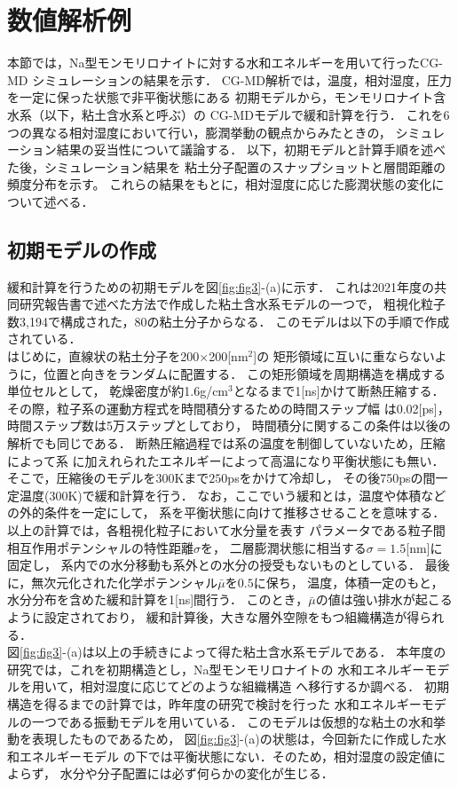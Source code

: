 \section{数値解析例}
本節では，Na型モンモリロナイトに対する水和エネルギーを用いて行ったCG-MD
シミュレーションの結果を示す．
CG-MD解析では，温度，相対湿度，圧力を一定に保った状態で非平衡状態にある
初期モデルから，モンモリロナイト含水系（以下，粘土含水系と呼ぶ）の
CG-MDモデルで緩和計算を行う．
これを6つの異なる相対湿度において行い，膨潤挙動の観点からみたときの，
シミュレーション結果の妥当性について議論する．
以下，初期モデルと計算手順を述べた後，シミュレーション結果を
粘土分子配置のスナップショットと層間距離の頻度分布を示す。
これらの結果をもとに，相対湿度に応じた膨潤状態の変化について述べる．
\subsection{初期モデルの作成}
緩和計算を行うための初期モデルを図\ref{fig:fig3}-(a)に示す．
これは2021年度の共同研究報告書で述べた方法で作成した粘土含水系モデルの一つで，
粗視化粒子数3,194で構成された，80の粘土分子からなる．
このモデルは以下の手順で作成されている．\\
はじめに，直線状の粘土分子を200$\times$200[nm$^2$]の
矩形領域に互いに重ならないように，位置と向きをランダムに配置する．
この矩形領域を周期構造を構成する単位セルとして，
乾燥密度が約1.6g/cm$^{3}$となるまで1[ns]かけて断熱圧縮する．
その際，粒子系の運動方程式を時間積分するための時間ステップ幅
は0.02[ps]，時間ステップ数は5万ステップとしており，
時間積分に関するこの条件は以後の解析でも同じである．
断熱圧縮過程では系の温度を制御していないため，圧縮によって系
に加えれられたエネルギーによって高温になり平衡状態にも無い．
そこで，圧縮後のモデルを300Kまで$250$psをかけて冷却し，
その後750psの間一定温度(300K)で緩和計算を行う．
なお，ここでいう緩和とは，温度や体積などの外的条件を一定にして，
系を平衡状態に向けて推移させることを意味する．
以上の計算では，各粗視化粒子において水分量を表す
パラメータである粒子間相互作用ポテンシャルの特性距離$\sigma$を，
二層膨潤状態に相当する$\sigma=1.5$[nm]に固定し，
系内での水分移動も系外との水分の授受もないものとしている．
最後に，無次元化された化学ポテンシャル$\bar \mu$を$0.5$に保ち，
温度，体積一定のもと，水分分布を含めた緩和計算を1[ns]間行う．
このとき，$\bar \mu$の値は強い排水が起こるように設定されており，
緩和計算後，大きな層外空隙をもつ組織構造が得られる．\\
図\ref{fig:fig3}-(a)は以上の手続きによって得た粘土含水系モデルである．
本年度の研究では，これを初期構造とし，Na型モンモリロナイトの
水和エネルギーモデルを用いて，相対湿度に応じてどのような組織構造
へ移行するか調べる．
初期構造を得るまでの計算では，昨年度の研究で検討を行った
水和エネルギーモデルの一つである振動モデルを用いている．
このモデルは仮想的な粘土の水和挙動を表現したものであるため，
図\ref{fig:fig3}-(a)の状態は，今回新たに作成した水和エネルギーモデル
の下では平衡状態にない．そのため，相対湿度の設定値によらず，
水分や分子配置には必ず何らかの変化が生じる．
